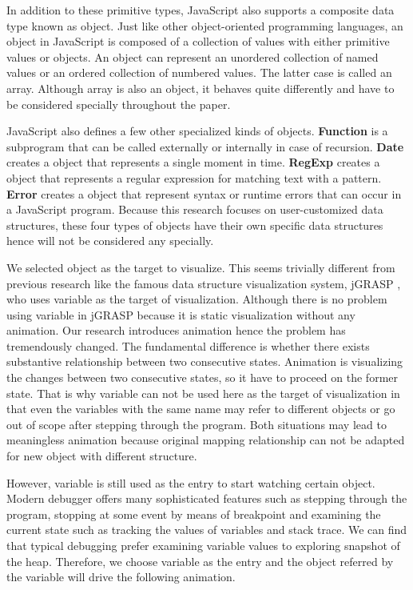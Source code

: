In addition to these primitive types, JavaScript also supports a composite data type known as object. Just like other object-oriented programming languages, an object in JavaScript is composed of a collection of values with either primitive values or objects. An object can represent an unordered collection of named values or an ordered collection of numbered values. The latter case is called an array. Although array is also an object, it behaves quite differently and have to be considered specially throughout the paper.

JavaScript also defines a few other specialized kinds of objects. \textbf{Function} is a subprogram that can be called externally or internally in case of recursion. \textbf{Date} creates a object that represents a single moment in time. \textbf{RegExp} creates a object that represents a regular expression for matching text with a pattern. \textbf{Error} creates a object that represent syntax or runtime errors that can occur in a JavaScript program. Because this research focuses on user-customized data structures, these four types of objects have their own specific data structures hence will not be considered any specially.

We selected object as the target to visualize. This seems trivially different from previous research like the famous data structure visualization system, jGRASP \cite{Cross:2007:DOV:1227310.1227316}, who uses variable as the target of visualization. Although there is no problem using variable in jGRASP because it is static visualization without any animation. Our research introduces animation hence the problem has tremendously changed. The fundamental difference is whether there exists substantive relationship between two consecutive states. Animation is visualizing the changes between two consecutive states, so it have to proceed on the former state. That is why variable can not be used here as the target of visualization in that even the variables with the same name may refer to different objects or go out of scope after stepping through the program. Both situations may lead to meaningless animation because original mapping relationship can not be adapted for new object with different structure.

However, variable is still used as the entry to start watching certain object. Modern debugger offers many sophisticated features such as stepping through the program, stopping at some event by means of breakpoint and examining the current state such as tracking the values of variables and stack trace. We can find that typical debugging prefer examining variable values to exploring snapshot of the heap. Therefore, we choose variable as the entry and the object referred by the variable will drive the following animation.

